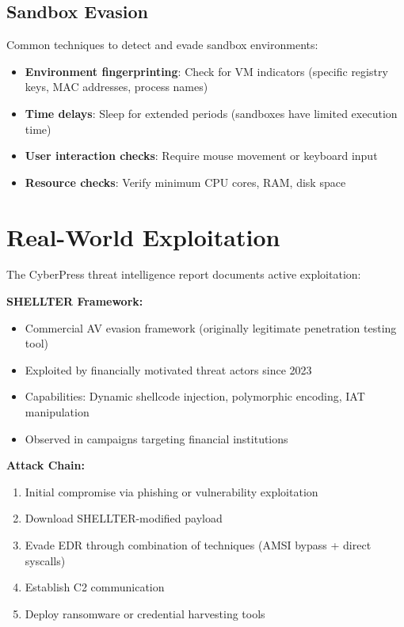 \documentclass[11pt,conference]{IEEEtran}
\begin{document}
\subsection{Sandbox Evasion}

Common techniques to detect and evade sandbox environments:

\begin{itemize}
    \item \textbf{Environment fingerprinting}: Check for VM indicators (specific registry keys, MAC addresses, process names)
    \item \textbf{Time delays}: Sleep for extended periods (sandboxes have limited execution time)
    \item \textbf{User interaction checks}: Require mouse movement or keyboard input
    \item \textbf{Resource checks}: Verify minimum CPU cores, RAM, disk space
\end{itemize}

\section{Real-World Exploitation}

The CyberPress threat intelligence report documents active exploitation:

\textbf{SHELLTER Framework:}
\begin{itemize}
    \item Commercial AV evasion framework (originally legitimate penetration testing tool)
    \item Exploited by financially motivated threat actors since 2023
    \item Capabilities: Dynamic shellcode injection, polymorphic encoding, IAT manipulation
    \item Observed in campaigns targeting financial institutions
\end{itemize}

\textbf{Attack Chain:}
\begin{enumerate}
    \item Initial compromise via phishing or vulnerability exploitation
    \item Download SHELLTER-modified payload
    \item Evade EDR through combination of techniques (AMSI bypass + direct syscalls)
    \item Establish C2 communication
    \item Deploy ransomware or credential harvesting tools
\end{enumerate}
\end{document}
